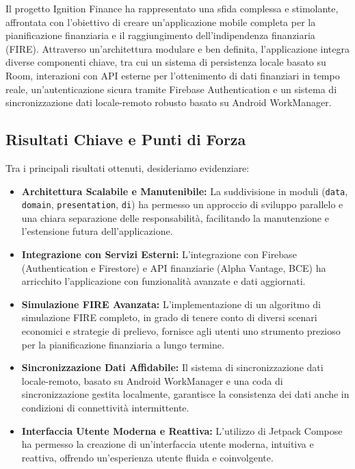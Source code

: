 
Il progetto Ignition Finance ha rappresentato una sfida complessa e stimolante,
affrontata con l'obiettivo di creare un'applicazione mobile completa per la
pianificazione finanziaria e il raggiungimento dell'indipendenza finanziaria
(FIRE).  Attraverso un'architettura modulare e ben definita, l'applicazione
integra diverse componenti chiave, tra cui un sistema di persistenza locale
basato su Room, interazioni con API esterne per l'ottenimento di dati finanziari
in tempo reale, un'autenticazione sicura tramite Firebase Authentication e un
sistema di sincronizzazione dati locale-remoto robusto basato su Android
WorkManager.

\subsection*{Risultati Chiave e Punti di Forza}

Tra i principali risultati ottenuti, desideriamo evidenziare:

\begin{itemize}
    \item \textbf{Architettura Scalabile e Manutenibile:}  La suddivisione in
    moduli (\texttt{data}, \texttt{domain}, \texttt{presentation}, \texttt{di})
    ha permesso un approccio di sviluppo parallelo e una chiara separazione
    delle responsabilità, facilitando la manutenzione e l'estensione futura
    dell'applicazione.
    \item \textbf{Integrazione con Servizi Esterni:} L'integrazione con Firebase
    (Authentication e Firestore) e API finanziarie (Alpha Vantage, BCE) ha
    arricchito l'applicazione con funzionalità avanzate e dati aggiornati.
    \item \textbf{Simulazione FIRE Avanzata:} L'implementazione di un algoritmo
    di simulazione FIRE completo, in grado di tenere conto di diversi scenari
    economici e strategie di prelievo, fornisce agli utenti uno strumento
    prezioso per la pianificazione finanziaria a lungo termine.
    \item \textbf{Sincronizzazione Dati Affidabile:} Il sistema di
    sincronizzazione dati locale-remoto, basato su Android WorkManager e una
    coda di sincronizzazione gestita localmente, garantisce la consistenza dei
    dati anche in condizioni di connettività intermittente.
    \item \textbf{Interfaccia Utente Moderna e Reattiva:} L'utilizzo di Jetpack
    Compose ha permesso la creazione di un'interfaccia utente moderna, intuitiva
    e reattiva, offrendo un'esperienza utente fluida e coinvolgente.
\end{itemize}


